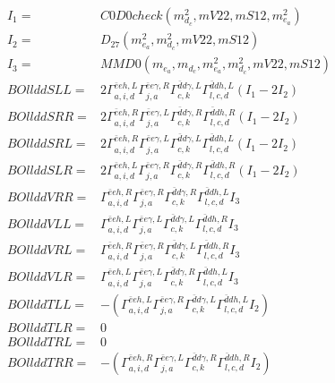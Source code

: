 \documentclass[A4,landscape]{article}
\begin{document}
\begin{align} 
I_1 = & C0D0check(m^2_{d_{{c}}}, mV22, mS12, m^2_{e_{{a}}}) \\ 
I_2 = & D_{27}(m^2_{e_{{a}}}, m^2_{d_{{c}}}, mV22, mS12) \\ 
I_3 = & MMD0(m_{e_{{a}}}, m_{d_{{c}}}, m^2_{e_{{a}}}, m^2_{d_{{c}}}, mV22, mS12) \\ 
  BOllddSLL= & 2  \Gamma^{\bar{e}e h ,L}_{a, i, d} \Gamma^{\bar{e}e \gamma ,R}_{j, a} \Gamma^{\bar{d}d \gamma ,L}_{c, k} \Gamma^{\bar{d}d h ,L}_{l, c, d} (I_1 - 2 I_2) \\ 
  BOllddSRR= & 2  \Gamma^{\bar{e}e h ,R}_{a, i, d} \Gamma^{\bar{e}e \gamma ,L}_{j, a} \Gamma^{\bar{d}d \gamma ,R}_{c, k} \Gamma^{\bar{d}d h ,R}_{l, c, d} (I_1 - 2 I_2) \\ 
  BOllddSRL= & 2  \Gamma^{\bar{e}e h ,R}_{a, i, d} \Gamma^{\bar{e}e \gamma ,L}_{j, a} \Gamma^{\bar{d}d \gamma ,L}_{c, k} \Gamma^{\bar{d}d h ,L}_{l, c, d} (I_1 - 2 I_2) \\ 
  BOllddSLR= & 2  \Gamma^{\bar{e}e h ,L}_{a, i, d} \Gamma^{\bar{e}e \gamma ,R}_{j, a} \Gamma^{\bar{d}d \gamma ,R}_{c, k} \Gamma^{\bar{d}d h ,R}_{l, c, d} (I_1 - 2 I_2) \\ 
  BOllddVRR= &  \Gamma^{\bar{e}e h ,R}_{a, i, d} \Gamma^{\bar{e}e \gamma ,R}_{j, a} \Gamma^{\bar{d}d \gamma ,R}_{c, k} \Gamma^{\bar{d}d h ,L}_{l, c, d} I_3 \\ 
  BOllddVLL= &  \Gamma^{\bar{e}e h ,L}_{a, i, d} \Gamma^{\bar{e}e \gamma ,L}_{j, a} \Gamma^{\bar{d}d \gamma ,L}_{c, k} \Gamma^{\bar{d}d h ,R}_{l, c, d} I_3 \\ 
  BOllddVRL= &  \Gamma^{\bar{e}e h ,R}_{a, i, d} \Gamma^{\bar{e}e \gamma ,R}_{j, a} \Gamma^{\bar{d}d \gamma ,L}_{c, k} \Gamma^{\bar{d}d h ,R}_{l, c, d} I_3 \\ 
  BOllddVLR= &  \Gamma^{\bar{e}e h ,L}_{a, i, d} \Gamma^{\bar{e}e \gamma ,L}_{j, a} \Gamma^{\bar{d}d \gamma ,R}_{c, k} \Gamma^{\bar{d}d h ,L}_{l, c, d} I_3 \\ 
  BOllddTLL= & -( \Gamma^{\bar{e}e h ,L}_{a, i, d} \Gamma^{\bar{e}e \gamma ,R}_{j, a} \Gamma^{\bar{d}d \gamma ,L}_{c, k} \Gamma^{\bar{d}d h ,L}_{l, c, d} I_2) \\ 
  BOllddTLR= & 0 \\ 
  BOllddTRL= & 0 \\ 
  BOllddTRR= & -( \Gamma^{\bar{e}e h ,R}_{a, i, d} \Gamma^{\bar{e}e \gamma ,L}_{j, a} \Gamma^{\bar{d}d \gamma ,R}_{c, k} \Gamma^{\bar{d}d h ,R}_{l, c, d} I_2) \\ 
\end{align} 
\end{document}
